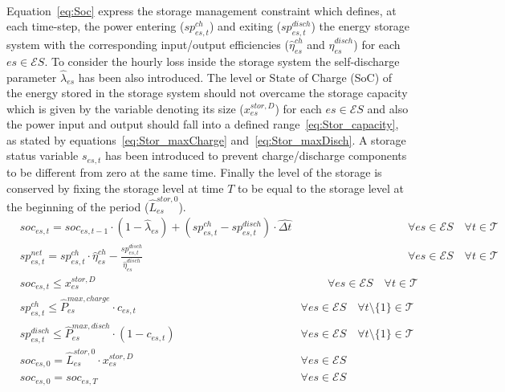 \documentclass{article}
\newcommand{\cT}{{\mathcal T}}
\newcommand{\cES}{{\mathcal ES}}
\begin{document}
{\begin{align}
		\end{align}
Equation~\eqref{eq:Soc} express the storage management constraint which defines, at each time-step, the power entering ($sp_{es,t}^{ch}$) and exiting ($sp_{es,t}^{disch}$) the energy storage system with the corresponding input/output efficiencies ($\hat{\eta}_{es}^{ch}$ and $\hat{\eta}_{es}^{disch}$) for each $es \in \cES$. To consider the hourly loss inside the storage system the self-discharge parameter $\hat{\lambda}_{es}$ has been also introduced. 
The level or State of Charge (SoC) of the energy stored in the storage system should not overcame the storage capacity which is given by the variable denoting its size ($x_{es}^{stor, D}$) for each $es \in \cES$ and also the power input and output should fall into a defined range~\eqref{eq:Stor_capacity}, as stated by equations~\eqref{eq:Stor_maxCharge} and~\eqref{eq:Stor_maxDisch}. A storage status variable $s_{es,t}$ has been introduced to prevent charge/discharge components to be different from zero at the same time. 
Finally the level of the storage is conserved by fixing the storage level at time $T$ to be equal to the storage level at the beginning of the period ($\hat{L}_{es}^{stor,0}$). 
		\begin{align}
		& soc_{es,t} = soc_{es,t-1} \cdot (1-\hat{\lambda}_{es}) + (sp_{es,t}^{ch} - sp_{es,t}^{disch}) \cdot \hat{\Delta t}  & \hspace{4cm} \forall es \in \cES \quad \forall t \in \cT \label{eq:Soc}\\
		& sp_{es,t}^{net} = sp_{es,t}^{ch} \cdot \hat{\eta}_{es}^{ch} - \frac{sp_{es,t}^{disch}}{\hat{\eta}_{es}^{disch}} & \hspace{4cm} \forall es \in \cES \quad \forall t \in \cT \label{eq:sp_net}\\
		& soc_{es,t} \leq x_{es}^{stor, D} &\hspace{1cm} \forall es \in \cES \quad \forall t \in \cT \label{eq:Stor_capacity}\\
		& sp_{es,t}^{ch} \leq \hat{P}_{es}^{max, charge} \cdot c_{es,t} & \forall es \in \cES \quad \forall t \setminus\{1\} \in \cT \label{eq:Stor_maxCharge}\\
		& sp_{es,t}^{disch} \leq \hat{P}_{es}^{max, disch} \cdot (1-c_{es,t}) & \forall es \in \cES \quad \forall t \setminus\{1\} \in \cT \label{eq:Stor_maxDisch}\\
		& soc_{es,0} = \hat{L}_{es}^{stor,0} \cdot x_{es}^{stor, D} &\forall es \in \cES \label{eq: Stor_init}\\
		& soc_{es,0} = soc_{es, T} &\forall es \in \cES \label{eq:Stor_boundaries}

\end{align}}
\end{document}
